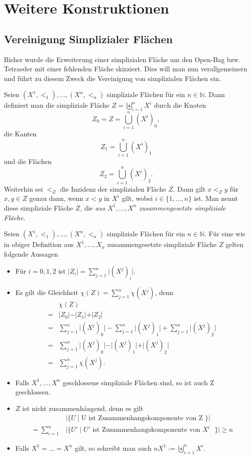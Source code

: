 \documentclass[12pt,titlepage]{article}
\begin{document}
\section{Weitere Konstruktionen}
\subsection{Vereinigung Simplizialer Flächen} 
Bisher wurde die Erweiterung einer simplizialen Fläche um den Open-Bag bzw. Tetraeder mit einer fehlenden Fläche skizziert. Dies will man nun verallgemeinern und führt zu diesem Zweck die Vereinigung von simplizialen Flächen ein.
\begin{definition} Seien $(X^1,<_1), \ldots,(X^n,<_n)$ simpliziale Flächen für ein $n \in \mathbb{N}$. Dann definiert man die simpliziale Fläche $Z=\biguplus\limits_{i=1}^{n} X^i$ durch
die Knoten 
\[
Z_0= Z=\bigcup\limits_{i=1}^{n} (X^i)_0,
\]
die Kanten 
\[
Z_1=\bigcup\limits_{i=1}^{n} (X^i)_1
\]
und die Flächen 
\[
Z_2=\bigcup\limits_{i=1}^{n} (X^i)_2.
\]
Weiterhin sei $<_Z$ die Inzidenz der simplizialen Fläche $Z$. Dann gilt $x<_{Z} y$ für $x,y \in Z$ genau dann, wenn $x<y$ in $X^i$ gilt, wobei $i \in \{1,\ldots,n\}$ ist. Man nennt diese simpliziale Fläche $Z$, die \emph{aus $X^1,\ldots,X^n$ zusammengesetzte simpliziale Fläche}.
\end{definition}
\begin{bemerkung}
 Seien $(X^1,<_1), \ldots,(X^n,<_n)$ simpliziale Flächen für ein $n \in \mathbb{N}$. 
 Für eine wie in obiger Definition aus $X^1,\ldots,X_n$ zusammengesetzte simpliziale Fläche $Z$ gelten folgende Aussagen
\begin{itemize}
\item Für $i=0,1,2$ ist $\vert Z_i\vert= \sum_{j=1}^n \vert (X^j)_i\vert$. 
\item  Es gilt die Gleichheit $\chi(Z)=\sum_{j=1}^n \chi(X^j)$, denn \begin{align*}
&\chi(Z)\\
=&\vert Z_0 \vert-\vert Z_1 \vert +\vert Z_2 \vert \\
=&\sum_{j=1}^n \vert (X^j)_0\vert-\sum_{j=1}^n \vert (X^j)_1\vert+\sum_{j=1}^n \vert (X^j)_2\vert\\
=&\sum_{j=1}^n \vert (X^j)_0\vert-\vert (X^j)_1\vert+\vert (X^j)_2\vert\\
=&\sum_{j=1}^n \chi(X^j).
\end{align*}
\item Falls $X^1,\ldots,X^n$ geschlossene simpliziale Flächen sind, so ist auch Z geschlossen.
\item $Z$ ist nicht zusammenhängend, denn es gilt 
\begin{align*}
&\vert \{ U \mid \text{U ist Zusammenhangskomponente von Z } \} \vert \\
=\sum_{i=1}^n &\vert \{U' \mid U' \text{ ist Zusammenhangskomponente von $X^i$ } \}\vert \geq  n
\end{align*}
\item Falls $X^1= \ldots =X^n$  gilt, so schreibt man auch $n X^1 :=\biguplus\limits_{i=1}^{n} X^i$.
\end{itemize}
\end{bemerkung}
\end{document}
